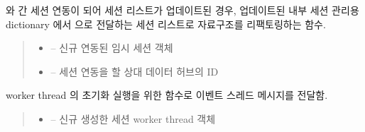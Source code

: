 \documentclass[a4paper,10pt,english]{sphinxmanual}
\begin{document}
\begin{fulllineitems}
\begin{fulllineitems}
\label{\detokenize{_SessionManager:SessionManager._refactoringSessionInfo}}
\pysigstartsignatures
{}
\pysigstopsignatures
\sphinxAtStartPar
{\hyperref[\detokenize{_SessionRequester:sessionrequester}]{}} 와 {\hyperref[\detokenize{_SessionListener:sessionlistener}]{}} 간 세션 연동이 되어 세션 리스트가 업데이트된 경우,
업데이트된 내부 세션 관리용 dictionary 에서 {\hyperref[\detokenize{_DHDaemon:dhdaemon}]{}} 으로 전달하는 세션 리스트로 자료구조를 리팩토링하는 함수.
\begin{quote}\begin{description}
\begin{itemize}
\item {} 
\sphinxAtStartPar
{} – 신규 연동된 임시 세션 객체

\item {} 
\sphinxAtStartPar
{} – 세션 연동을 할 상대 데이터 허브의 ID

\end{itemize}

\end{description}\end{quote}

\end{fulllineitems}


\begin{fulllineitems}
\label{\detokenize{_SessionManager:SessionManager._sessionInit}}
\pysigstartsignatures
{}
\pysigstopsignatures
\sphinxAtStartPar
{\hyperref[\detokenize{_Session:session}]{}} worker thread 의 초기화 실행을 위한 함수로  이벤트 스레드 메시지를 전달함.
\begin{quote}\begin{description}
\begin{itemize}
\item {} 
\sphinxAtStartPar
{} – 신규 생성한 세션 worker thread 객체


\end{itemize}
\end{description}
\end{quote}
\end{fulllineitems}
\end{fulllineitems}
\end{document}
